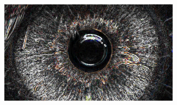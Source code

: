 \documentclass{article}
\begin{document}
\begin{figure}[H]
\begin{subfigure}{.47\textwidth}
  \centering
  \includegraphics[width=0.97\linewidth]{_Figures/raw_data_1_sobel.png}
  \caption{}
  \label{fig:raw_1_sobel}
\end{subfigure}


\end{figure}
\end{document}
